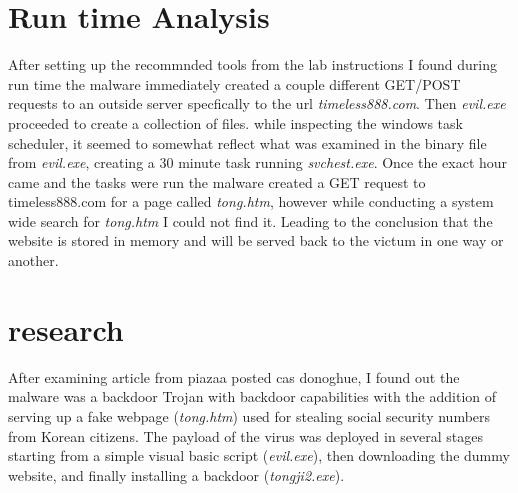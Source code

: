\documentclass[letterpaper,12pt,titlepage,onecolumn]{IEEEtran}
\begin{document}
\section{Run time Analysis}
After setting up the recommnded tools from the lab instructions I found during run time the malware immediately created a couple different GET/POST requests to an outside server specfically to the url \textit{timeless888.com}. Then \textit{evil.exe} proceeded to create a collection of files.
while inspecting the windows task scheduler, it seemed to somewhat reflect what was examined in the binary file from \textit{evil.exe}, creating a 30 minute task running \textit{svchest.exe}. Once the exact hour came and the tasks were run the malware created a GET request to timeless888.com for a page called \textit{tong.htm}, however while conducting a system wide search for \textit{tong.htm} I could not find it. Leading to the conclusion that the website is stored in memory and will be served back to the victum in one way or another. 



\section{research}
After examining article from piazaa posted cas donoghue\cite{Analysis26:online}, I found out the malware was a backdoor Trojan with backdoor capabilities with the addition of serving up a fake webpage (\textit{tong.htm}) used for stealing social security numbers from Korean citizens. The payload of the virus was deployed in several stages starting from a simple visual basic script (\textit{evil.exe}), then downloading the dummy website, and finally installing a backdoor (\textit{tongji2.exe}).

  
\nocite{*}%


\end{document}
